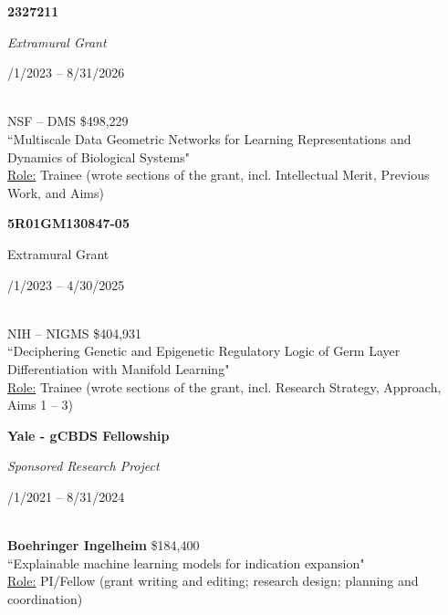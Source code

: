 \documentclass[margin,line]{res}
\begin{document}
\begin{resume}
\noindent
\begin{minipage}[t]{0.4\textwidth}
    \raggedright \textbf{2327211}
\end{minipage}%
\begin{minipage}[t]{0.3\textwidth}
    \centering \textit{Extramural Grant}
\end{minipage}%
\begin{minipage}[t]{0.3\textwidth}
    /1/2023 -- 8/31/2026
\end{minipage}
\\[.2em]
NSF -- DMS \hfill \$498,229\\[.2em]
``Multiscale Data Geometric Networks for Learning Representations and Dynamics of Biological Systems"\\[.2em]
\ul{Role:} Trainee {\small (wrote sections of the grant, incl. Intellectual Merit, Previous Work, and Aims)}

\noindent
\begin{minipage}[t]{0.4\textwidth}
    \raggedright \textbf{5R01GM130847-05}
\end{minipage}%
\begin{minipage}[t]{0.3\textwidth}
    \centering Extramural Grant
\end{minipage}%
\begin{minipage}[t]{0.3\textwidth}
    /1/2023 -- 4/30/2025
\end{minipage}
\\[.2em]
NIH -- NIGMS \hfill \$404,931 \\[.2em]
``Deciphering Genetic and Epigenetic Regulatory Logic of Germ Layer Differentiation with Manifold Learning"\\[.2em]
\ul{Role:} Trainee {\small (wrote sections of the grant, incl. Research Strategy, Approach, Aims 1 -- 3)}

\noindent
\begin{minipage}[t]{0.4\textwidth}
    \raggedright \textbf{Yale - gCBDS Fellowship}
\end{minipage}%
\begin{minipage}[t]{0.3\textwidth}
    \centering \textit{Sponsored Research Project}
\end{minipage}%
\begin{minipage}[t]{0.3\textwidth}
    /1/2021 -- 8/31/2024
\end{minipage}
\\[.2em]
\textbf{Boehringer Ingelheim} \hfill \$184,400 \\[.2em]
``Explainable machine learning models for indication expansion"\\[.2em]
\ul{Role:} PI/Fellow {\small (grant writing and editing; research design; planning and coordination)}


\end{resume}
\end{document}
